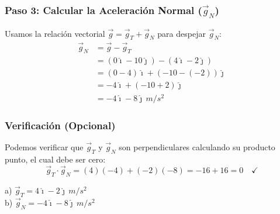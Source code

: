 \documentclass[12pt, a4paper]{article}
\begin{document}
\subsubsection*{Paso 3: Calcular la Aceleración Normal ($\vec{g}_N$)}
Usamos la relación vectorial $\vec{g} = \vec{g}_T + \vec{g}_N$ para despejar $\vec{g}_N$:
\begin{align*}
\vec{g}_N &= \vec{g} - \vec{g}_T \\
&= (0\hat{\imath} - 10\hat{\jmath}) - (4\hat{\imath} - 2\hat{\jmath}) \\
&= (0 - 4)\hat{\imath} + (-10 - (-2))\hat{\jmath} \\
&= -4\hat{\imath} + (-10 + 2)\hat{\jmath} \\
&= -4\hat{\imath} - 8\hat{\jmath} \, \si{m/s^2}
\end{align*}

\subsubsection*{Verificación (Opcional)}
Podemos verificar que $\vec{g}_T$ y $\vec{g}_N$ son perpendiculares calculando su producto punto, el cual debe ser cero:
\begin{equation*}
\vec{g}_T \cdot \vec{g}_N = (4)(-4) + (-2)(-8) = -16 + 16 = 0 \quad \checkmark
\end{equation*}

\begin{tcolorbox}[colback=blue!5!white, colframe=blue!75!black, title=Respuesta Final]
\centering
\large
a) $\vec{g}_T = 4\hat{\imath} - 2\hat{\jmath} \, \si{m/s^2}$ \\[0.5em]
b) $\vec{g}_N = -4\hat{\imath} - 8\hat{\jmath} \, \si{m/s^2}$
\end{tcolorbox}

\newpage
\end{document}
